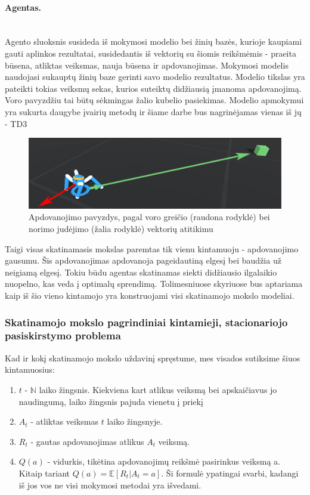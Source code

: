 \documentclass[a4paper, 12pt]{article}
\begin{document}
\paragraph {Agentas.}\mbox{}\\
Agento sluoksnis susideda iš mokymosi modelio bei žinių bazės, kurioje kaupiami gauti aplinkos rezultatai, susidedantis iš vektorių su šiomis reikšmėmis - praeita būsena, atliktas veiksmas, nauja būsena ir apdovanojimas. Mokymosi modelis naudojasi sukauptų žinių baze gerinti savo modelio rezultatus. Modelio tikslas yra pateikti tokias veiksmų sekas, kurios suteiktų didžiausią įmanoma apdovanojimą. Voro pavyzdžiu tai būtų sėkmingas žalio kubelio pasiekimas. Modelio apmokymui yra sukurta daugybe įvairių metodų ir šiame darbe bus nagrinėjamas vienas iš jų - TD3


\begin{figure}[h]
\centering
\includegraphics[width=1\textwidth]{voroGreicioVektoriai}
\caption{Apdovanojimo pavyzdys, pagal voro greičio (raudona rodyklė) bei norimo judėjimo (žalia rodyklė) vektorių atitikimu}
\label{voroGreicioVektoriai}
\end{figure}

Taigi visas skatinamasis mokslas paremtas tik vienu kintamuoju - apdovanojimo gausumu. Šis apdovanojimas apdovanoja pageidautiną elgesį bei baudžia už neigiamą elgesį. Tokiu būdu agentas skatinamas siekti didžiausio ilgalaikio nuopelno, kas veda į optimalų sprendimą. Tolimesniuose skyriuose bus aptariama kaip iš šio vieno kintamojo yra konstruojami visi skatinamojo mokslo modeliai.

%
\subsubsection{Skatinamojo mokslo pagrindiniai kintamieji, stacionariojo pasiskirstymo problema}
%

Kad ir kokį skatinamojo mokslo uždavinį spręstume, mes visados sutiksime šiuos kintamuosius:

\begin{enumerate}
  \addtolength{\itemsep}{-0.5\baselineskip} 
  \item $t$ - $\mathbb{N}$ laiko žingsnis. Kiekviena kart atlikus veiksmą bei apskaičiavus jo naudingumą, laiko žingsnis pajuda vienetu į priekį
  \item $A_t$ - atliktas veiksmas $t$ laiko žingsnyje.
  \item $R_t$ - gautas apdovanojimas atlikus $A_t$ veiksmą.
  \item $Q(a)$ - vidurkis, tikėtina apdovanojimų reikšmė pasirinkus veiksmą a. Kitaip tariant $Q(a) = \mathbb{E}[R_t | A_t = a] $. Ši formulė ypatingai svarbi, kadangi iš jos vos ne visi mokymosi metodai yra išvedami.
\end{enumerate}
\end{document}
